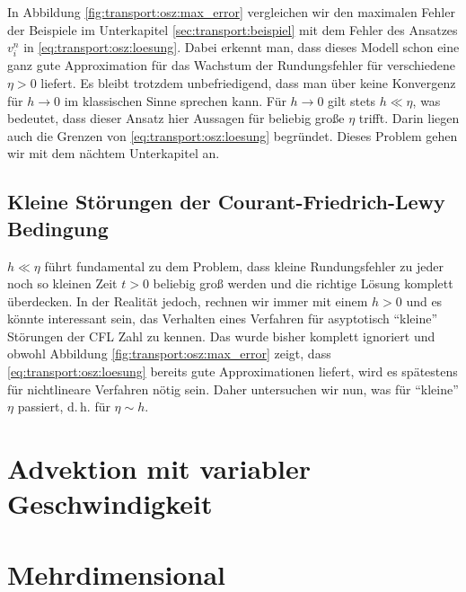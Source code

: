 In Abbildung \ref{fig:transport:osz:max_error} vergleichen wir den maximalen Fehler der Beispiele im Unterkapitel \ref{sec:transport:beispiel} mit dem Fehler des Ansatzes $v^n_i$ in \eqref{eq:transport:osz:loesung}.
Dabei erkennt man, dass dieses Modell schon eine ganz gute Approximation für das Wachstum der Rundungsfehler für verschiedene $\eta > 0$ liefert.
Es bleibt trotzdem unbefriedigend, dass man über keine Konvergenz für $h \to 0$ im klassischen Sinne sprechen kann.
Für $h \to 0$ gilt stets $h \ll \eta$, was bedeutet, dass dieser Ansatz hier Aussagen für beliebig große $\eta$ trifft.
Darin liegen auch die Grenzen von \eqref{eq:transport:osz:loesung} begründet.
Dieses Problem gehen wir mit dem nächtem Unterkapitel an.

\subsection{Kleine Störungen der Courant-Friedrich-Lewy Bedingung}

$h \ll \eta$ führt fundamental zu dem Problem, dass kleine Rundungsfehler zu jeder noch so kleinen Zeit $t > 0$ beliebig groß werden und die richtige Lösung komplett überdecken.
In der Realität jedoch, rechnen wir immer mit einem $h > 0$ und es könnte interessant sein, das Verhalten eines Verfahren für asyptotisch ``kleine'' Störungen der CFL Zahl zu kennen.
Das wurde bisher komplett ignoriert und obwohl Abbildung \ref{fig:transport:osz:max_error} zeigt, dass \eqref{eq:transport:osz:loesung} bereits gute Approximationen liefert, wird es spätestens für nichtlineare Verfahren nötig sein.
Daher untersuchen wir nun, was für ``kleine'' $\eta$ passiert, d.\,h. für $\eta \sim h$.
\section{Advektion mit variabler Geschwindigkeit}

\section{Mehrdimensional}